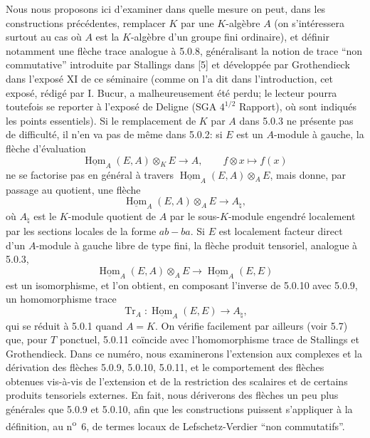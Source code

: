 \documentclass[11pt]{article}
\DeclareMathOperator{\Hom}{Hom}
\providecommand{\uHom}{\underline{\Hom}}
\providecommand{\Tr}{\operatorname{Tr}}
\providecommand{\Tr}{\operatorname{Tr}}
\providecommand{\Tr}{\operatorname{Tr}}
\providecommand{\Hom}{\operatorname{Hom}}
\providecommand{\Tr}{\operatorname{Tr}}
\providecommand{\Hom}{\operatorname{Hom}}
\providecommand{\Tr}{\operatorname{Tr}}
\begin{document}
Nous nous proposons ici d'examiner dans quelle mesure on peut, dans les constructions précédentes, remplacer $K$ par une $K$-algèbre $A$ (on s'intéressera surtout au cas où $A$ est la $K$-algèbre d'un groupe fini ordinaire), et définir notamment une flèche trace analogue à 5.0.8, généralisant la notion de trace ``non commutative'' introduite par Stallings dans [5] et développée par Grothendieck dans l'exposé XI de ce séminaire (comme on l'a dit dans l'introduction, cet exposé, rédigé par I. Bucur, a malheureusement été perdu; le lecteur pourra toutefois se reporter à l'exposé de Deligne (SGA $4^{1/2}$ Rapport), où sont indiqués les points essentiels). Si le remplacement de $K$ par $A$ dans 5.0.3 ne présente pas de difficulté, il n'en va pas de même dans 5.0.2: si $E$ est un $A$-module à gauche, la flèche d'évaluation
\[
\uHom_A(E,A)\otimes_KE\longrightarrow A,
\qquad f\otimes x\longmapsto f(x)
\]
ne se factorise pas en général à travers $\uHom_A(E,A)\otimes_AE$, mais donne, par passage au quotient, une flèche
\begin{equation}\tag{5.0.9}
\uHom_A(E,A)\otimes_AE\longrightarrow A_\natural,
\end{equation}
où $A_\natural$ est le $K$-module quotient de $A$ par le sous-$K$-module engendré localement par les sections locales de la forme $ab-ba$. Si $E$ est localement facteur direct d'un $A$-module à gauche libre de type fini, la flèche produit tensoriel, analogue à 5.0.3,
\begin{equation}\tag{5.0.10}
\uHom_A(E,A)\otimes_AE\longrightarrow\uHom_A(E,E)
\end{equation}
est un isomorphisme, et l'on obtient, en composant l'inverse de 5.0.10 avec 5.0.9, un homomorphisme trace
\begin{equation}\tag{5.0.11}
\Tr_A:\uHom_A(E,E)\longrightarrow A_\natural,
\end{equation}
qui se réduit à 5.0.1 quand $A=K$. On vérifie facilement par ailleurs (voir 5.7) que, pour $T$ ponctuel, 5.0.11 coïncide avec l'homomorphisme trace de Stallings et Grothendieck. Dans ce numéro, nous examinerons l'extension aux complexes et la dérivation des flèches 5.0.9, 5.0.10, 5.0.11, et le comportement des flèches obtenues vis-à-vis de l'extension et de la restriction des scalaires et de certains produits tensoriels externes. En fait, nous dériverons des flèches un peu plus générales que 5.0.9 et 5.0.10, afin que les constructions puissent s'appliquer à la définition, au n\textsuperscript{o}~6, de termes locaux de Lefschetz-Verdier ``non commutatifs''.
\end{document}
